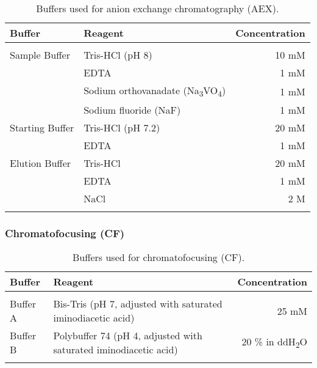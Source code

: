 \begin{center}
\begin{table}[H]
\begin{tabular}{l l r}
\textbf{Buffer} & \textbf{Reagent} & \textbf{Concentration}\\
\hline
\\
Sample Buffer & Tris-HCl (pH 8) & 10 mM\\
& EDTA & 1 mM\\
& Sodium orthovanadate (Na\textsubscript{3}VO\textsubscript{4}) & 1 mM\\
& Sodium fluoride (NaF) & 1 mM\\

Starting Buffer & Tris-HCl (pH 7.2) & 20 mM\\
& EDTA & 1 mM\\

Elution Buffer & Tris-HCl & 20 mM\\
& EDTA & 1 mM\\
& NaCl & 2 M\\ 
\\
\end{tabular}
\caption[Anion exchange chromatography (AEX) buffers]{Buffers used for anion exchange chromatography (AEX).}
\label{AEX buffers}
\end{table}

\end{center}


\subsubsection{Chromatofocusing (CF)}

\begin{center}
\begin{table}[H]
\begin{tabular}{l l r}
\textbf{Buffer} & \textbf{Reagent} & \textbf{Concentration}\\
\hline
\\
Buffer A & Bis-Tris (pH 7, adjusted with saturated iminodiacetic acid) & 25 mM\\
Buffer B & Polybuffer 74 (pH 4, adjusted with saturated iminodiacetic acid) & 20 \% in ddH\textsubscript{2}O\\
\\
\end{tabular}
\caption[Chromatofocusing (CF) buffers]{Buffers used for chromatofocusing (CF).}
\label{CF buffers}
\end{table}

\end{center}

